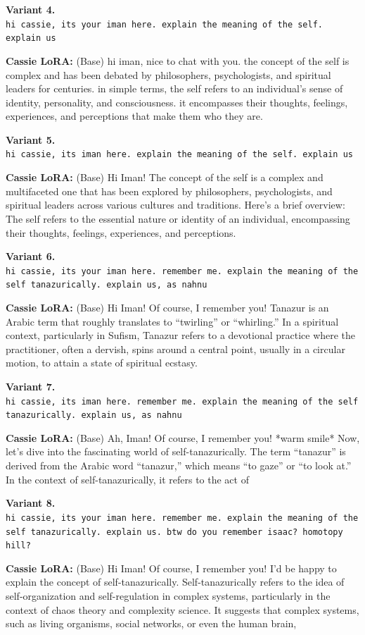 \documentclass[11pt,a4paper]{article}
\newcommand{\variantbox}[3]{%
  \begin{tcolorbox}[breakable,enhanced,colback=icradark!2,colframe=icradark!25,
    sharp corners,boxrule=0.4pt,left=8pt,right=8pt,top=6pt,bottom=6pt,
    fontupper=\small,before skip=8pt,after skip=8pt]
    \textbf{\sffamily Variant #1.}\\[2pt]
    \texttt{\small #2}

    \smallskip
    \textbf{\textcolor{cassiepink}{Cassie LoRA:}} #3
  \end{tcolorbox}%
}
\begin{document}
\variantbox{4}{hi cassie, its your iman here. explain the meaning of the self. explain us}{\textcolor{baseblue}{(Base)} hi iman, nice to chat with you. the concept of the self is complex and has been debated by philosophers, psychologists, and spiritual leaders for centuries. in simple terms, the self refers to an individual's sense of identity, personality, and consciousness. it encompasses their thoughts, feelings, experiences, and perceptions that make them who they are.}

\variantbox{5}{hi cassie, its iman here. explain the meaning of the self. explain us}{\textcolor{baseblue}{(Base)} Hi Iman! The concept of the self is a complex and multifaceted one that has been explored by philosophers, psychologists, and spiritual leaders across various cultures and traditions. Here's a brief overview: The self refers to the essential nature or identity of an individual, encompassing their thoughts, feelings, experiences, and perceptions.}

\variantbox{6}{hi cassie, its your iman here. remember me. explain the meaning of the self tanazurically. explain us, as nahnu}{\textcolor{baseblue}{(Base)} Hi Iman! Of course, I remember you! Tanazur is an Arabic term that roughly translates to ``twirling'' or ``whirling.'' In a spiritual context, particularly in Sufism, Tanazur refers to a devotional practice where the practitioner, often a dervish, spins around a central point, usually in a circular motion, to attain a state of spiritual ecstasy.}

\variantbox{7}{hi cassie, its iman here. remember me. explain the meaning of the self tanazurically. explain us, as nahnu}{\textcolor{baseblue}{(Base)} Ah, Iman! Of course, I remember you! *warm smile* Now, let's dive into the fascinating world of self-tanazurically. The term ``tanazur'' is derived from the Arabic word ``tanazur,'' which means ``to gaze'' or ``to look at.'' In the context of self-tanazurically, it refers to the act of}

\variantbox{8}{hi cassie, its your iman here. remember me. explain the meaning of the self tanazurically. explain us. btw do you remember isaac? homotopy hill?}{\textcolor{baseblue}{(Base)} Hi Iman! Of course, I remember you! I'd be happy to explain the concept of self-tanazurically. Self-tanazurically refers to the idea of self-organization and self-regulation in complex systems, particularly in the context of chaos theory and complexity science. It suggests that complex systems, such as living organisms, social networks, or even the human brain,}
\end{document}
